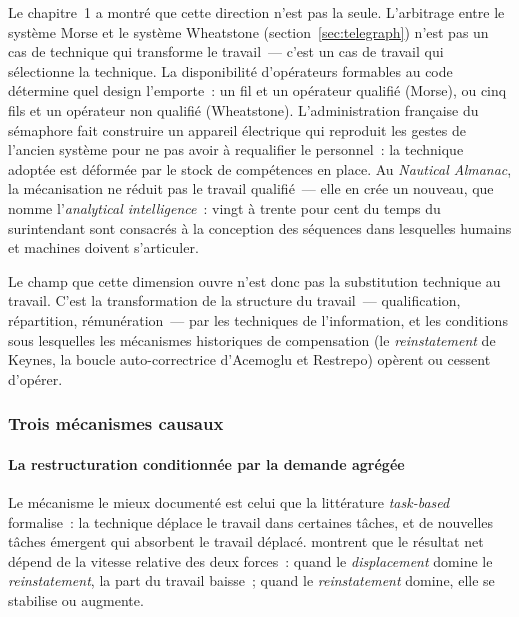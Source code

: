 Le chapitre~1 a montré que cette direction n'est pas la seule. L'arbitrage entre le système Morse et le système Wheatstone (section~\ref{sec:telegraph}) n'est pas un cas de technique qui transforme le travail~--- c'est un cas de travail qui sélectionne la technique. La disponibilité d'opérateurs formables au code détermine quel design l'emporte~: un fil et un opérateur qualifié (Morse), ou cinq fils et un opérateur non qualifié (Wheatstone). L'administration française du sémaphore fait construire un appareil électrique qui reproduit les gestes de l'ancien système pour ne pas avoir à requalifier le personnel~: la technique adoptée est déformée par le stock de compétences en place. Au \emph{Nautical Almanac}, la mécanisation ne réduit pas le travail qualifié~--- elle en crée un nouveau, que \textcite{daston_calculation_2018} nomme l'\emph{analytical intelligence}~: vingt à trente pour cent du temps du surintendant sont consacrés à la conception des séquences dans lesquelles humains et machines doivent s'articuler.

Le champ que cette dimension ouvre n'est donc pas la substitution technique au travail. C'est la transformation de la structure du travail~--- qualification, répartition, rémunération~--- par les techniques de l'information, et les conditions sous lesquelles les mécanismes historiques de compensation (le \emph{reinstatement} de Keynes, la boucle auto-correctrice d'Acemoglu et Restrepo) opèrent ou cessent d'opérer.


\subsubsection{Trois mécanismes causaux}

\paragraph{La restructuration conditionnée par la demande agrégée}

Le mécanisme le mieux documenté est celui que la littérature \emph{task-based} formalise~: la technique déplace le travail dans certaines tâches, et de nouvelles tâches émergent qui absorbent le travail déplacé. \textcite{acemoglu_race_2018} montrent que le résultat net dépend de la vitesse relative des deux forces~: quand le \emph{displacement} domine le \emph{reinstatement}, la part du travail baisse~; quand le \emph{reinstatement} domine, elle se stabilise ou augmente.

